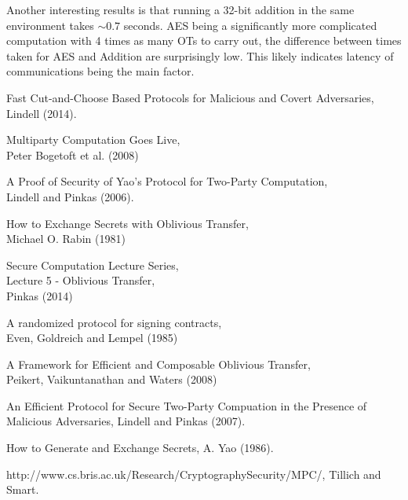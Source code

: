 \documentclass[a4paper,10pt]{article}
\begin{document}
			Another interesting results is that running a 32-bit addition in the same environment takes $\sim 0.7$ seconds. AES being a significantly more complicated computation with 4 times as many OTs to carry out, the difference between times taken for AES and Addition are surprisingly low. This likely indicates latency of communications being the main factor.


	\begin{thebibliography}{5}
			Fast Cut-and-Choose Based Protocols for Malicious and Covert Adversaries,\\
			Lindell (2014).

			Multiparty Computation Goes Live,\\
			Peter Bogetoft et al. (2008)

			A Proof of Security of Yao’s Protocol for Two-Party Computation,\\
			Lindell and Pinkas (2006).
    
			How to Exchange Secrets with Oblivious Transfer,\\
			Michael O. Rabin (1981)

			Secure Computation Lecture Series,\\
			Lecture 5 - Oblivious Transfer,\\
			Pinkas (2014)

			A randomized protocol for signing contracts,\\
			Even, Goldreich and Lempel (1985)

 			A Framework for Efficient and Composable Oblivious Transfer,\\
			Peikert, Vaikuntanathan and Waters (2008)

			An Efficient Protocol for Secure Two-Party Compuation in the Presence of Malicious Adversaries,
			Lindell and Pinkas (2007).

			How to Generate and Exchange Secrets,
			A. Yao (1986).

			http://www.cs.bris.ac.uk/Research/CryptographySecurity/MPC/,
			Tillich and Smart. 

	\end{thebibliography}
\end{document}

